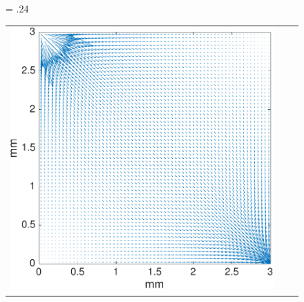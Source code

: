 \documentclass[journal,twocolumn]{IEEEtran}
\newlength{\fwd}
\begin{document}
\begin{figure}[h!tb]
	\centering
	\fwd = .24\textwidth
	\begin{tabular}{c c c}
		\includegraphics[width=\fwd]{figs/qmat.pdf} & 
\end{tabular}
\end{figure}
\end{document}
